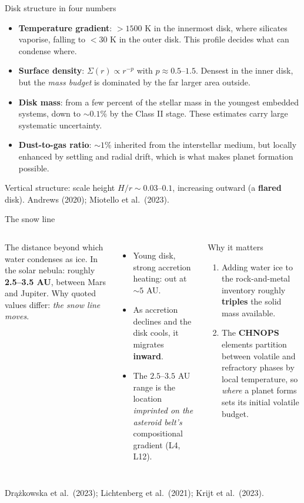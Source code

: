 \documentclass[aspectratio=169, 11pt]{beamer}
\begin{document}
\begin{frame}{Disk structure in four numbers}
  \begin{itemize}
    \item \textbf{Temperature gradient}: $> 1500$ K in the innermost disk, where silicates vaporise, falling to $< 30$ K in the outer disk. This profile decides what can condense where.
    \item \textbf{Surface density}: $\Sigma(r) \propto r^{-p}$ with $p \approx 0.5$--$1.5$. Densest in the inner disk, but the \emph{mass budget} is dominated by the far larger area outside.
    \item \textbf{Disk mass}: from a few percent of the stellar mass in the youngest embedded systems, down to $\sim 0.1\%$ by the Class II stage. These estimates carry large systematic uncertainty.
    \item \textbf{Dust-to-gas ratio}: $\sim 1\%$ inherited from the interstellar medium, but locally enhanced by settling and radial drift, which is what makes planet formation possible.
  \end{itemize}
  \vskip2pt\relax
  Vertical structure: scale height $H/r \sim 0.03$--$0.1$, increasing outward (a \textbf{flared} disk).
  \vskip2pt\relax
  {\footnotesize Andrews (2020); Miotello et al.\ (2023).}
\end{frame}

\begin{frame}{The snow line}
  \begin{columns}[T]
    The distance beyond which water condenses as ice. In the solar nebula: roughly \textbf{2.5--3.5 AU}, between Mars and Jupiter.
    \vskip6pt\relax
    Why quoted values differ: \emph{the snow line moves}.
    \begin{itemize}
      \item Young disk, strong accretion heating: out at $\sim 5$ AU.
      \item As accretion declines and the disk cools, it migrates \textbf{inward}.
      \item The $2.5$--$3.5$ AU range is the location \emph{imprinted on the asteroid belt's} compositional gradient (L4, L12).
    \end{itemize}

    \begin{block}{Why it matters}
      \begin{enumerate}
        \item Adding water ice to the rock-and-metal inventory roughly \textbf{triples} the solid mass available.
        \item The \textbf{CHNOPS} elements partition between volatile and refractory phases by local temperature, so \emph{where} a planet forms sets its initial volatile budget.
      \end{enumerate}
    \end{block}
  \end{columns}
  \vskip2pt\relax
  {\footnotesize Dr\k{a}\.zkowska et al.\ (2023); Lichtenberg et al.\ (2021); Krijt et al.\ (2023).}
\end{frame}
\end{document}
